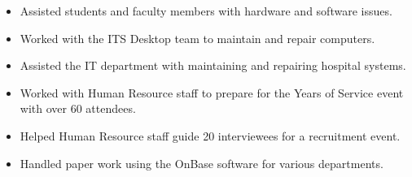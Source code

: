\documentclass[10pt,letter]{altacv}
\begin{document}



\begin{itemize}
  \item Assisted students and faculty members with hardware and software issues.
  \item Worked with the ITS Desktop team to maintain and repair computers.
\end{itemize}

\divider

\begin{itemize}
  \item Assisted the IT department with maintaining and repairing hospital systems.
  \item Worked with Human Resource staff to prepare for the Years of Service event with over 60 attendees.
  \item Helped Human Resource staff guide 20 interviewees for a recruitment event.
  \item Handled paper work using the OnBase software for various departments.
\end{itemize}

\end{document}
